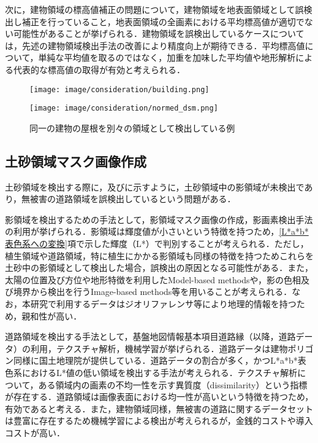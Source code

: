       次に，建物領域の標高値補正の問題について，建物領域を地表面領域として誤検出し補正を行っていること，地表面領域の全画素における平均標高値が適切でない可能性があることが挙げられる．建物領域を誤検出しているケースについては，先述の建物領域検出手法の改善により精度向上が期待できる．平均標高値について，単純な平均値を取るのではなく，加重を加味した平均値や地形解析による代表的な標高値の取得が有効と考えられる．

      \begin{figure}[tbp]
        \begin{minipage}[c]{0.5\hsize}
          \centering
          \texttt{[image: image/consideration/building.png]}
        \end{minipage}
        \begin{minipage}[c]{0.5\hsize}
          \centering
          \texttt{[image: image/consideration/normed\_dsm.png]}
        \end{minipage}
        \caption{同一の建物の屋根を別々の領域として検出している例}
        \label{建物領域低精度例}
      \end{figure}      


    \subsection*{土砂領域マスク画像作成}
      土砂領域を検出する際に，及びに示すように，土砂領域中の影領域が未検出であり，無被害の道路領域を誤検出しているという問題がある．

      影領域を検出するための手法として，影領域マスク画像の作成，影画素検出手法の利用が挙げられる．影領域は輝度値が小さいという特徴を持つため，\ref{L*a*b*表色系への変換}項で示した輝度（L*）で判別することが考えられる．ただし，植生領域や道路領域，特に植生にかかる影領域も同様の特徴を持つためこれらを土砂中の影領域として検出した場合，誤検出の原因となる可能性がある．また，太陽の位置及び方位や地形特徴を利用したModel-based methodsや，影の色相及び境界から検出を行うImage-based methods等を用いることが考えられる．なお，本研究で利用するデータはジオリファレンサ等により地理的情報を持つため，親和性が高い\cite{影領域検出}．

      道路領域を検出する手法として，基盤地図情報基本項目道路縁（以降，道路データ）の利用，テクスチャ解析，機械学習が挙げられる．道路データは建物ポリゴン同様に国土地理院が提供している．道路データの割合が多く，かつL*a*b*表色系におけるL*値の低い領域を検出する手法が考えられる．テクスチャ解析について，ある領域内の画素の不均一性を示す異質度（dissimilarity）という指標が存在する\cite{異質度}．道路領域は画像表面における均一性が高いという特徴を持つため，有効であると考える．また，建物領域同様，無被害の道路に関するデータセットは豊富に存在するため機械学習による検出が考えられるが，金銭的コストや導入コストが高い．

